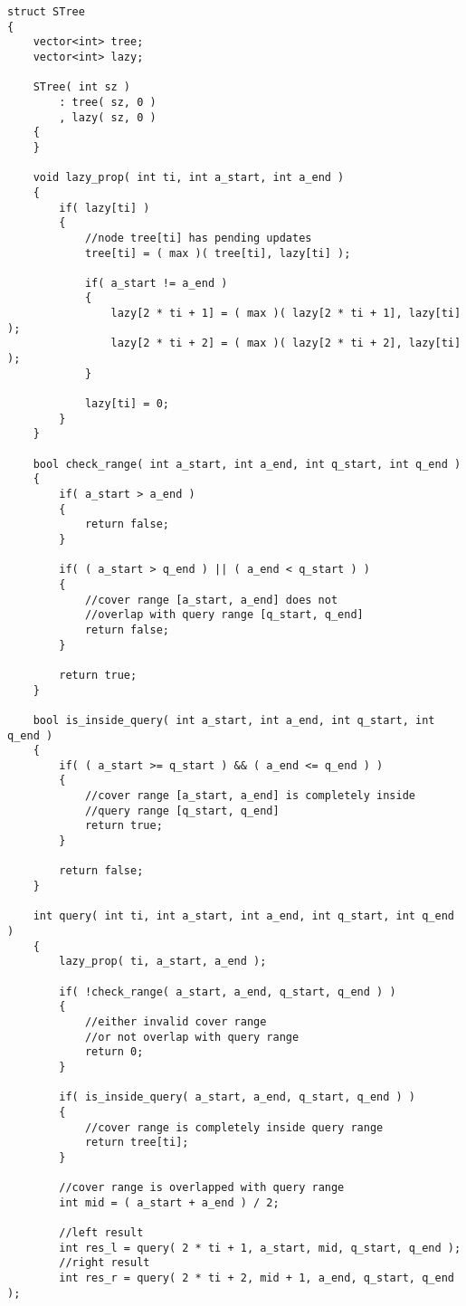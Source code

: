 \begin{lstlisting}[style=customc, caption={Segment Tree}]
struct STree
{
    vector<int> tree;
    vector<int> lazy;

    STree( int sz )
        : tree( sz, 0 )
        , lazy( sz, 0 )
    {
    }

    void lazy_prop( int ti, int a_start, int a_end )
    {
        if( lazy[ti] )
        {
            //node tree[ti] has pending updates
            tree[ti] = ( max )( tree[ti], lazy[ti] );

            if( a_start != a_end )
            {
                lazy[2 * ti + 1] = ( max )( lazy[2 * ti + 1], lazy[ti] );
                lazy[2 * ti + 2] = ( max )( lazy[2 * ti + 2], lazy[ti] );
            }

            lazy[ti] = 0;
        }
    }

    bool check_range( int a_start, int a_end, int q_start, int q_end )
    {
        if( a_start > a_end )
        {
            return false;
        }

        if( ( a_start > q_end ) || ( a_end < q_start ) )
        {
            //cover range [a_start, a_end] does not
            //overlap with query range [q_start, q_end]
            return false;
        }

        return true;
    }

    bool is_inside_query( int a_start, int a_end, int q_start, int q_end )
    {
        if( ( a_start >= q_start ) && ( a_end <= q_end ) )
        {
            //cover range [a_start, a_end] is completely inside
            //query range [q_start, q_end]
            return true;
        }

        return false;
    }

    int query( int ti, int a_start, int a_end, int q_start, int q_end )
    {
        lazy_prop( ti, a_start, a_end );

        if( !check_range( a_start, a_end, q_start, q_end ) )
        {
            //either invalid cover range
            //or not overlap with query range
            return 0;
        }

        if( is_inside_query( a_start, a_end, q_start, q_end ) )
        {
            //cover range is completely inside query range
            return tree[ti];
        }

        //cover range is overlapped with query range
        int mid = ( a_start + a_end ) / 2;

        //left result
        int res_l = query( 2 * ti + 1, a_start, mid, q_start, q_end );
        //right result
        int res_r = query( 2 * ti + 2, mid + 1, a_end, q_start, q_end );


\end{lstlisting}
